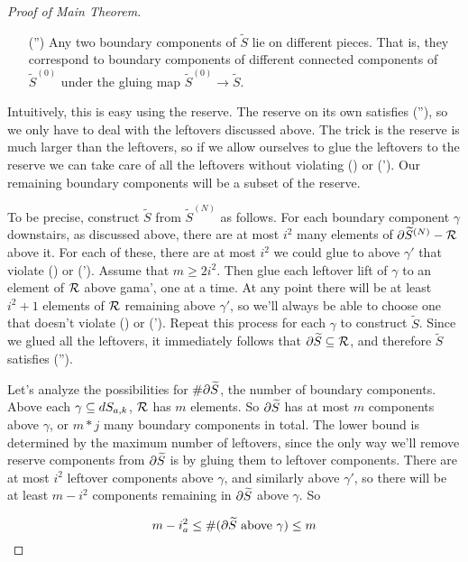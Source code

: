 \begin{proof}[Proof of Main Theorem]
\begin{enumerate}

\item[(\dag'')] Any two boundary components of $\widetilde{S}$ lie on different
pieces. That is, they correspond to boundary components of different connected
components of $\widetilde{S}^{(0)}$ under the gluing map $\widetilde{S}^{(0)}
\to \widetilde{S}$.

\end{enumerate}

Intuitively, this is easy using the reserve. The reserve on its own satisfies
(\dag''), so we only have to deal with the leftovers discussed above.  The trick
is the reserve is much larger than the leftovers, so if we allow ourselves to
glue the leftovers to the reserve we can take care of all the leftovers without
violating (\dag) or (\dag'). Our remaining boundary components will be a subset
of the reserve.

To be precise, construct $\widetilde{S}$ from $\widetilde{S}^{(N)}$ as follows.
For each boundary component $\gamma$ downstairs, as discussed above, there are
at most $i^2$ many elements of $\partial\widetilde{S}^{(N)}-\mathcal{R}$ above it. For each of
these, there are at most $i^2$ we could glue to above $\gamma'$ that violate
(\dag) or (\dag').  Assume that $m\geq 2i^2$.  Then glue each leftover lift of
$\gamma$ to an element of $\mathcal{R}$ above gama', one at a time. At any point there
will be at least $i^2+1$ elements of $\mathcal{R}$ remaining above $\gamma'$, so we'll
always be able to choose one that doesn't violate (\dag) or (\dag'). Repeat
this process for each $\gamma$ to construct $\widetilde{S}$.  Since we glued
all the leftovers, it immediately follows that $\partial\widetilde{S} \subseteq \mathcal{R}$, and
therefore $\widetilde{S}$ satisfies (\dag'').

Let's analyze the possibilities for $\#\partial\widetilde{S}$, the number of
boundary components. Above each $\gamma \subseteq dS_{a,k}$,
$\mathcal{R}$ has $m$ elements. So $\partial\widetilde{S}$ has at most $m$ components above
$\gamma$, or $m*j$ many boundary components in total. The lower bound is
determined by the maximum number of leftovers, since the only way we'll remove
reserve components from $\partial\widetilde{S}$ is by gluing them to leftover
components. There are at most $i^2$ leftover components above $\gamma$, and
similarly above $\gamma'$, so there will be at least $m - i^2$ components
remaining in $\partial\widetilde{S}$ above $\gamma$. So

\[ m-i_a^2 \leq \#(\partial\widetilde{S} \text{ above }\gamma) \leq m \]


\end{proof}
